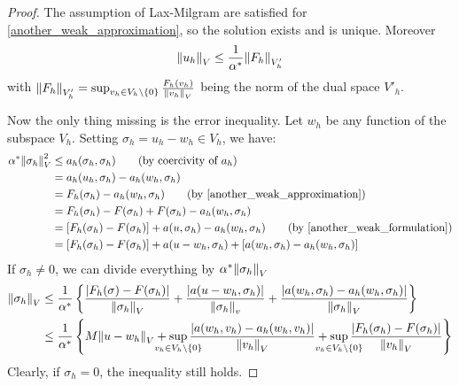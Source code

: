 \begin{proof}
    The assumption of Lax-Milgram are satisfied for \eqref{another_weak_approximation}, so the solution exists and is unique. Moreover
    \[
        \norm{u_h}_V \leq \frac{1}{\alpha^*} \norm{F_h}_{V'_h} 
    \]
    with \(\norm{F_h}_{V'_h} = \sup_{v_h \in V_h \backslash \left\{0\right\}} \frac{F_h(v_h)}{\norm{v_h}_V}\) being the norm of the dual space \(V'_h\).

    Now the only thing missing is the error inequality. Let \(w_h\) be any function of the subspace \(V_h\). Setting \(\sigma_h = u_h -w_h \in V_h\), we have:
    \begin{align*}
        \alpha^* \norm{\sigma_h}^2_V &\leq a_h(\sigma_h, \sigma_h) \tag*{(by coercivity of \(a_h\))} \\
        &= a_h(u_h, \sigma_h) - a_h(w_h, \sigma_h) \\
        &= F_h(\sigma_h) - a_h(w_h, \sigma_h) \tag*{(by \eqref{another_weak_approximation})} \\
        &= F_h(\sigma_h) - F(\sigma_h) + F(\sigma_h) - a_h(w_h, \sigma_h) \\
        &= \left[F_h(\sigma_h)-F(\sigma_h)\right] + a(u, \sigma_h) - a_h(w_h, \sigma_h) \tag*{(by \eqref{another_weak_formulation})} \\
        &= \left[F_h(\sigma_h) - F(\sigma_h)\right] + a(u-w_h, \sigma_h) + \left[a(w_h, \sigma_h) - a_h(w_h, \sigma_h)\right]
    \end{align*}
    If \(\sigma_h \neq 0\), we can divide everything by \(\alpha^*\norm{\sigma_h}_V\)
    \begin{align*}
        \norm{\sigma_h}_V &\leq \frac{1}{\alpha^*} \left\{\frac{\abs{F_h(\sigma) - F(\sigma_h)}}{\norm{\sigma_h}_V} + \frac{\abs{a(u-w_h,\sigma_h)}}{\norm{\sigma_h}_v} + \frac{\abs{a(w_h, \sigma_h) - a_h(w_h, \sigma_h)}}{\norm{\sigma_h}_V}\right\} \\
        &\leq \frac{1}{\alpha^*} \left\{M\norm{u-w_h}_V + \sup_{\mathclap{v_h \in V_h \backslash \left\{0\right\}}} \frac{\abs{a(w_h, v_h) - a_h(w_h, v_h)}}{\norm{v_h}_V} + \sup_{\mathclap{v_h \in V_h \backslash \left\{0\right\}}}\frac{\abs{F_h(\sigma_h)-F(\sigma_h)}}{\norm{v_h}_V}\right\}
    \end{align*}
    Clearly, if \(\sigma_h = 0\), the inequality still holds.


\end{proof}
